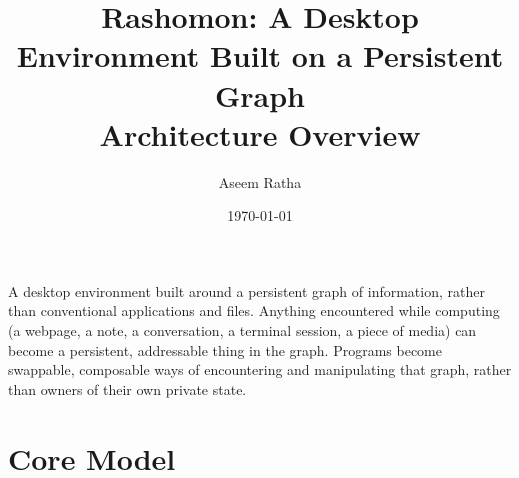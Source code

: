 \documentclass[11pt]{article}
\author{Aseem Ratha}
\date{\today}
\title{Rashomon: A Desktop Environment Built on a Persistent Graph\\\medskip
\large Architecture Overview}
\begin{document}
\maketitle
\setcounter{tocdepth}{2}
\tableofcontents

\clearpage

A desktop environment built around a persistent graph of information, rather than conventional applications and files. Anything encountered while computing (a webpage, a note, a conversation, a terminal session, a piece of media) can become a persistent, addressable thing in the graph. Programs become swappable, composable ways of encountering and manipulating that graph, rather than owners of their own private state.
\section{Core Model}
\label{sec:orgb7fc979}
\end{document}
